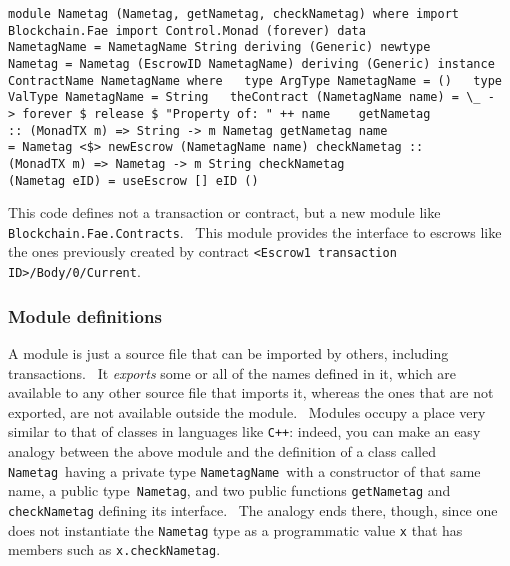 \documentclass[11pt]{article}
\newcommand{\codeblock}[1]{\begin{mdframed}[
    backgroundcolor=header-color,
    linecolor=header-color,
    innertopmargin=10pt,
    ]{\texttt{#1}}\end{mdframed}}
\begin{document}
\codeblock{module Nametag (Nametag, getNametag, checkNametag) where\newline
\newline
import Blockchain.Fae\newline
import Control.Monad (forever)\newline
\newline
data NametagName = NametagName String deriving (Generic)\newline
newtype Nametag = Nametag (EscrowID NametagName) deriving (Generic)\newline
\newline
instance ContractName NametagName where\newline
  type ArgType NametagName = ()\newline
  type ValType NametagName = String\newline
  theContract (NametagName name) = \textbackslash{}\_ -\textgreater{} forever \$ release \$ "Property of: " ++ name\newline
  \newline
getNametag :: (MonadTX m) =\textgreater{} String -\textgreater{} m Nametag\newline
getNametag name = Nametag \textless{}\$\textgreater{} newEscrow (NametagName name)\newline
\newline
checkNametag :: (MonadTX m) =\textgreater{} Nametag -\textgreater{} m String\newline
checkNametag (Nametag eID) = useEscrow {[}{]} eID ()}

This code defines not a transaction or contract, but a new module like \texttt{Blockchain.Fae.Contracts}.  This module provides the interface to escrows like the ones previously created by contract \texttt{\textless{}}\texttt{Escrow1 transaction ID}\texttt{\textgreater{}}\texttt{\slash{}Body\slash{}0\slash{}Current}.

\subsubsection{Module definitions}
\vspace{5.5pt}

A module is just a source file that can be imported by others, including transactions.  It \textit{exports} some or all of the names defined in it, which are available to any other source file that imports it, whereas the ones that are not exported, are not available outside the module.  Modules occupy a place very similar to that of classes in languages like \texttt{C++}: indeed, you can make an easy analogy between the above module and the definition of a class called \texttt{Nametag} having a private type \texttt{NametagName} with a constructor of that same name, a public type \texttt{Nametag}, and two public functions \texttt{getNametag} and \texttt{checkNametag} defining its interface.  The analogy ends there, though, since one does not instantiate the \texttt{Nametag} type as a programmatic value \texttt{x} that has members such as \texttt{x.checkNametag}.
\end{document}
